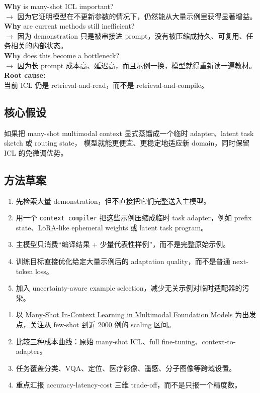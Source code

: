 \documentclass[12pt,a4paper]{article}
\begin{document}
\begin{whybox}
\textbf{Why} is many-shot ICL important?\\
$\rightarrow$ 因为它证明模型在不更新参数的情况下，仍然能从大量示例里获得显著增益。\\[3pt]
\textbf{Why} are current methods still inefficient?\\
$\rightarrow$ 因为 demonstration 只是被串接进 prompt，没有被压缩成持久、可复用、任务相关的内部状态。\\[3pt]
\textbf{Why} does this become a bottleneck?\\
$\rightarrow$ 因为长 prompt 成本高、延迟高，而且示例一换，模型就得重新读一遍教材。\\[3pt]
\textbf{Root cause:}\\
当前 ICL 仍是 retrieval-and-read，而不是 retrieval-and-compile。
\end{whybox}

\subsection{核心假设}

如果把 many-shot multimodal context 显式蒸馏成一个临时 adapter、latent task sketch 或 routing state，
模型就能更便宜、更稳定地适应新 domain，同时保留 ICL 的免微调优势。

\subsection{方法草案}

\begin{enumerate}[leftmargin=2em]
  \item 先检索大量 demonstration，但不直接把它们完整送入主模型。
  \item 用一个 \texttt{context compiler} 把这些示例压缩成临时 task adapter，例如 prefix state、LoRA-like ephemeral weights 或 latent task program。
  \item 主模型只消费``编译结果 + 少量代表性样例''，而不是完整原始示例。
  \item 训练目标直接优化给定大量示例后的 adaptation quality，而不是普通 next-token loss。
  \item 加入 uncertainty-aware example selection，减少无关示例对临时适配器的污染。
\end{enumerate}

\begin{expbox}
\begin{enumerate}[leftmargin=2em]
  \item 以 \href{https://arxiv.org/abs/2405.09798}{Many-Shot In-Context Learning in Multimodal Foundation Models} 为出发点，关注从 few-shot 到近 2000 例的 scaling 区间。
  \item 比较三种成本曲线：原始 many-shot ICL、full fine-tuning、context-to-adapter。
  \item 任务覆盖分类、VQA、定位、医疗影像、遥感、分子图像等跨域设置。
  \item 重点汇报 accuracy-latency-cost 三维 trade-off，而不是只报一个精度数。
\end{enumerate}
\end{expbox}
\end{document}
